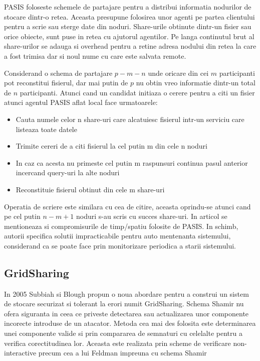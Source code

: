 \documentclass{llncs}
\begin{document}
PASIS foloseste schemele de partajare pentru a distribui informatia nodurilor de stocare dintr-o retea. Aceasta presupune folosirea unor agenti pe partea clientului pentru a scrie sau sterge date din noduri. Share-urile obtinute dintr-un fisier sau orice obiecte, sunt puse in retea cu ajutorul agentilor. Pe langa continutul brut al share-urilor se adauga si overhead pentru a retine adresa nodului din retea la care a fost trimisa dar si noul nume cu care este salvata remote.

Considerand o schema de partajare $p-m-n$ unde oricare din cei $m$ participanti pot reconstitui fisierul, dar mai putin de $p$ nu obtin vreo informatie dintr-un total de $n$ participanti. Atunci cand un candidat initiaza o cerere pentru a citi un fisier atunci agentul PASIS aflat local face urmatoarele: 
\begin{itemize}
	\item Cauta numele celor n share-uri care alcatuiesc fisierul intr-un serviciu care listeaza toate datele
	\item Trimite cereri de a citi fisierul la cel putin m din cele n noduri
	\item In caz ca acesta nu primeste cel putin m raspunsuri continua pasul anterior incercand query-uri la alte noduri
	\item Reconstituie fisierul obtinut din cele m share-uri
\end{itemize}
Operatia de scriere este similara cu cea de citire, aceasta oprindu-se atunci cand pe cel putin $n - m + 1$ noduri s-au scris cu succes share-uri.
In articol se mentioneaza si compromisurile de timp/spatiu folosite de PASIS. In schimb, autorii specifica solutii impracticabile pentru auto mentenanta sistemului, considerand ca se poate face prin monitorizare periodica a starii sistemului.

\subsection{GridSharing} 
In 2005 Subbiah si Blough propun o noua abordare pentru a construi un sistem de stocare securizat si tolerant la erori numit GridSharing.
Schema Shamir nu ofera siguranta in ceea ce priveste detectarea sau actualizarea unor componente incorecte introduse de un atacator. Metoda cea mai des folosita este determinarea unei componente valide si prin compararea de semnaturi %
cu celelalte pentru a verifica corectitudinea lor. Aceasta este realizata prin scheme de verificare non-interactive precum cea a lui Feldman impreuna cu schema Shamir \cite{Feldman:1987}
\end{document}
